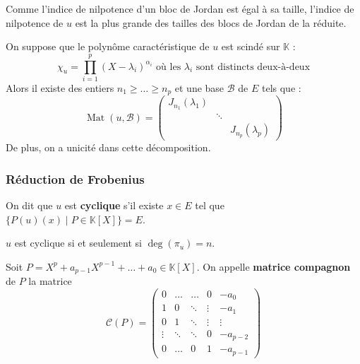   \begin{remark}
    Comme l'indice de nilpotence d'un bloc de Jordan est égal à sa taille, l'indice de nilpotence de $u$ est la plus grande des tailles des blocs de Jordan de la réduite.
  \end{remark}


  \begin{theorem}
    On suppose que le polynôme caractéristique de $u$ est scindé sur $\mathbb{K}$ :
    \[ \chi_u = \prod_{i=1}^p (X - \lambda_i)^{\alpha_i} \text{ où les } \lambda_i \text{ sont distincts deux-à-deux} \]
    Alors il existe des entiers $n_1 \geq \dots \geq n_p$ et une base $\mathcal{B}$ de $E$ tels que :
    \[ \operatorname{Mat}(u, \mathcal{B}) = \begin{pmatrix} J_{n_1}(\lambda_1) & & \\ & \ddots & \\ & & J_{n_p}(\lambda_p) \end{pmatrix} \]
    De plus, on a unicité dans cette décomposition.
  \end{theorem}

  \subsubsection{Réduction de Frobenius}


  \begin{definition}
    \label{151-2}
    On dit que $u$ est \textbf{cyclique} s'il existe $x \in E$ tel que $\{ P(u)(x) \mid P \in \mathbb{K}[X] \} = E$.
  \end{definition}

  \begin{proposition}
    $u$ est cyclique si et seulement si $\deg(\pi_u) = n$.
  \end{proposition}

  \begin{definition}
    Soit $P = X^p + a_{p-1} X^{p-1} + \dots + a_0 \in \mathbb{K}[X]$. On appelle \textbf{matrice compagnon} de $P$ la matrice
    \[ \mathcal{C}(P) = \begin{pmatrix} 0 & \dots & \dots & 0 & -a_0 \\ 1 & 0 & \ddots & \vdots & -a_1 \\ 0 & 1 & \ddots & \vdots & \vdots \\ \vdots & \ddots & \ddots & 0 & -a_{p-2} \\ 0 & \dots & 0 & 1 & -a_{p-1} \end{pmatrix} \]
  \end{definition}

